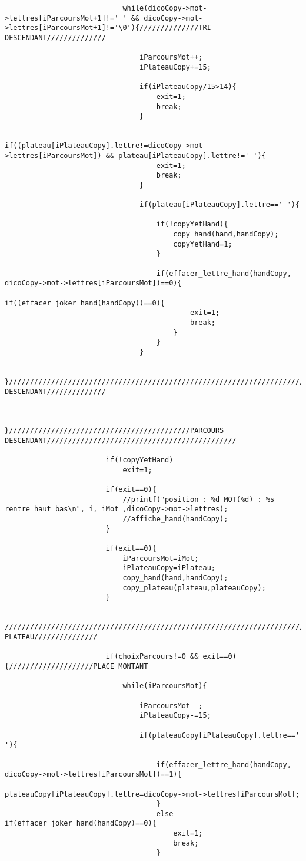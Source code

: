 \documentclass[a4paper]{article}
\begin{document}
\begin{verbatim}
							while(dicoCopy->mot->lettres[iParcoursMot+1]!=' ' && dicoCopy->mot->lettres[iParcoursMot+1]!='\0'){//////////////TRI DESCENDANT//////////////

								iParcoursMot++;
								iPlateauCopy+=15;

								if(iPlateauCopy/15>14){
									exit=1;
									break;
								}

								if((plateau[iPlateauCopy].lettre!=dicoCopy->mot->lettres[iParcoursMot]) && plateau[iPlateauCopy].lettre!=' '){
									exit=1;
									break;
								}

								if(plateau[iPlateauCopy].lettre==' '){

									if(!copyYetHand){
										copy_hand(hand,handCopy);
										copyYetHand=1;
									}

									if(effacer_lettre_hand(handCopy, dicoCopy->mot->lettres[iParcoursMot])==0){
										if((effacer_joker_hand(handCopy))==0){
											exit=1;
											break;
										}
									}
								}

							}////////////////////////////////////////////////////////////////////////////////////////////////////////////////TRI DESCENDANT//////////////


						}///////////////////////////////////////////PARCOURS DESCENDANT/////////////////////////////////////////////

						if(!copyYetHand)
							exit=1;

						if(exit==0){
							//printf("position : %d MOT(%d) : %s rentre haut bas\n", i, iMot ,dicoCopy->mot->lettres);
							//affiche_hand(handCopy);
						}

						if(exit==0){
							iParcoursMot=iMot;
							iPlateauCopy=iPlateau;
							copy_hand(hand,handCopy);
							copy_plateau(plateau,plateauCopy);
						}
						
						//////////////////////////////////////////////////////////////////////////////////////////////////////////PLACE PLATEAU///////////////

						if(choixParcours!=0 && exit==0){////////////////////PLACE MONTANT

							while(iParcoursMot){

								iParcoursMot--;
								iPlateauCopy-=15;

								if(plateauCopy[iPlateauCopy].lettre==' '){

									if(effacer_lettre_hand(handCopy, dicoCopy->mot->lettres[iParcoursMot])==1){
										plateauCopy[iPlateauCopy].lettre=dicoCopy->mot->lettres[iParcoursMot];
									}
									else if(effacer_joker_hand(handCopy)==0){
										exit=1;
										break;												
									}


\end{verbatim}
\end{document}
